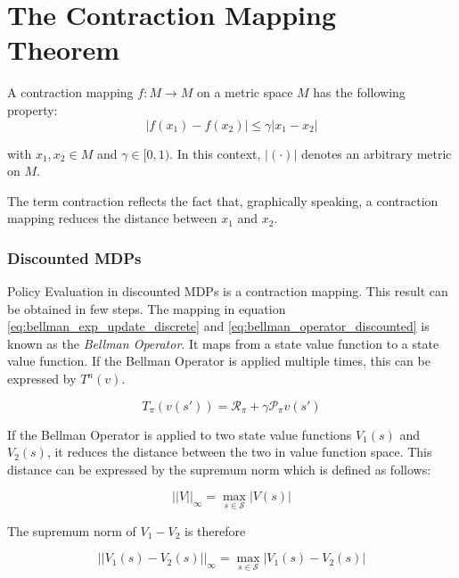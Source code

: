\section{The Contraction Mapping Theorem}
\label{sec:contraction_mappings}
A contraction mapping $f: M \to M$ on a metric space $M$ has the following property:
\begin{equation}
|f(x_1)-f(x_2)| \leq \gamma |x_1-x_2|
\end{equation}

with $x_1,x_2 \in M$ and $\gamma \in [0,1)$. In this context,  $|(\cdot)|$ denotes an arbitrary metric on $M$.

The term contraction reflects the fact that, graphically speaking, a contraction mapping reduces the distance between $x_1$ and $x_2$.

\subsubsection{Discounted MDPs}

Policy Evaluation in discounted MDPs is a contraction mapping. This result can be obtained in few steps. The mapping in equation \ref{eq:bellman_exp_update_discrete} and \ref{eq:bellman_operator_discounted} is known as the \textit{Bellman Operator}. It maps from a state value function to a state value function. If the Bellman Operator is applied multiple times, this can be expressed by $T^n(v)$.

\begin{equation}
T_\pi(v(s'))=\mathcal{R}_\pi+\gamma \mathcal{P}_\pi v(s')
\label{eq:bellman_operator_discounted}
\end{equation}

If the Bellman Operator is applied to two state value functions $V_1(s)$ and $V_2(s)$, it reduces the distance between the two in value function space. This distance can be expressed by the supremum norm which is defined as follows:

\begin{equation}
||V||_\infty = \max_{s \in \mathcal{S}} |V(s)|
\end{equation}

The supremum norm of $V_1 - V_2$ is therefore

\begin{equation}
||V_1(s) - V_2(s)||_\infty = \max_{s \in \mathcal{S}} |V_1(s)-V_2(s)|
\end{equation}


